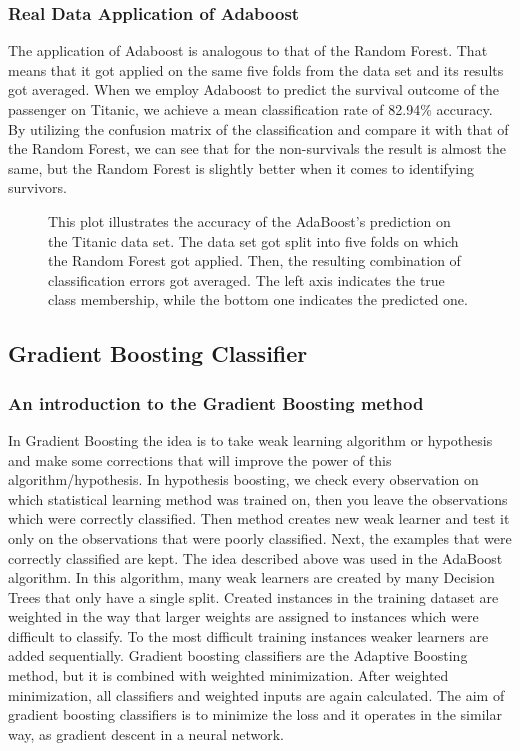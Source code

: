 \subsubsection{Real Data Application of Adaboost}
The application of Adaboost is analogous to that of the Random Forest. 
That means that it got applied on the same five folds from the data set and its results got averaged.
When we employ Adaboost to predict the survival outcome of the passenger on Titanic, 
we achieve a mean classification rate of 82.94\% accuracy. By utilizing the confusion matrix of the classification 
and compare it with that of the Random Forest, we can see that for the non-survivals the result is almost the same,
but the Random Forest is slightly better when it comes to identifying survivors.

\begin{figure}[H]
    \captionsetup{format=plain}
    \caption
        {This plot illustrates the accuracy of the AdaBoost's prediction on the Titanic data set.
        The data set got split into five folds on which the Random Forest got applied. 
        Then, the resulting combination of classification errors got averaged.
        The left axis indicates the true class membership, while the bottom one indicates the predicted one.
        }
    \label{fig:confusion_matrix_adaboost}
\end{figure}


\subsection{Gradient Boosting Classifier}
\label{sec:gradient_boosting}

\subsubsection{An introduction to the Gradient Boosting method}
In Gradient Boosting the idea is to take weak learning algorithm or hypothesis 
and make some corrections that will improve the power of this algorithm/hypothesis. 
In hypothesis boosting, we check every observation on which statistical learning method was trained on, 
then you leave the observations which were correctly classified. Then method creates new weak learner 
and test it only on the observations that were poorly classified. 
Next, the examples that were correctly classified are kept.
The idea described above was used in the AdaBoost algorithm. 
In this algorithm, many weak learners are created by many Decision Trees that only have a single split. 
Created instances in the training dataset are weighted in the way that larger weights are assigned to instances which were difficult to classify. To the most difficult training instances weaker learners are added sequentially.
Gradient boosting classifiers are the Adaptive Boosting method, but it is combined with weighted minimization. After weighted minimization, all classifiers and weighted inputs are again calculated. The aim of gradient boosting classifiers is to minimize the loss and it operates in the similar way, as gradient descent in a neural network.

